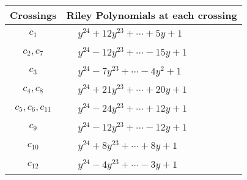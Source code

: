 \documentclass[1p]{elsarticle_modified}
\theoremstyle{definition}
\begin{document}
\begin{tabular}{m{50pt}|m{274pt}}
Crossings & \hspace{64pt}Riley Polynomials at each crossing \\
\hline $$\begin{aligned}c_{1}\end{aligned}$$&$\begin{aligned}
&y^{24}+12 y^{23}+\cdots+5 y+1
\end{aligned}$\\
\hline $$\begin{aligned}c_{2},c_{7}\end{aligned}$$&$\begin{aligned}
&y^{24}-12 y^{23}+\cdots-15 y+1
\end{aligned}$\\
\hline $$\begin{aligned}c_{3}\end{aligned}$$&$\begin{aligned}
&y^{24}-7 y^{23}+\cdots-4 y^2+1
\end{aligned}$\\
\hline $$\begin{aligned}c_{4},c_{8}\end{aligned}$$&$\begin{aligned}
&y^{24}+21 y^{23}+\cdots+20 y+1
\end{aligned}$\\
\hline $$\begin{aligned}c_{5},c_{6},c_{11}\end{aligned}$$&$\begin{aligned}
&y^{24}-24 y^{23}+\cdots+12 y+1
\end{aligned}$\\
\hline $$\begin{aligned}c_{9}\end{aligned}$$&$\begin{aligned}
&y^{24}-12 y^{23}+\cdots-12 y+1
\end{aligned}$\\
\hline $$\begin{aligned}c_{10}\end{aligned}$$&$\begin{aligned}
&y^{24}+8 y^{23}+\cdots+8 y+1
\end{aligned}$\\
\hline $$\begin{aligned}c_{12}\end{aligned}$$&$\begin{aligned}
&y^{24}-4 y^{23}+\cdots-3 y+1
\end{aligned}$\\
\hline
\end{tabular}\\~\\
\end{document}
